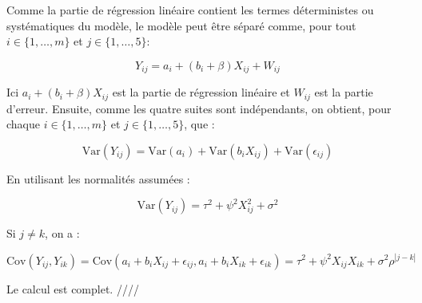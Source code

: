 \documentclass[../main.tex]{subfiles}
\begin{document}
\begin{CJK*}{UTF8}{gbsn}
Comme la partie de régression linéaire contient les termes déterministes ou systématiques du modèle,
le modèle peut être séparé comme, pour tout $i \in \{1, \dots, m\}$ et $j \in \{1, \dots, 5\}$:

\[
Y_{ij} = a_i + (b_i + \beta) X_{ij} + W_{ij}
\]

Ici \(a_i + (b_i + \beta) X_{ij}\) est la partie de régression linéaire et \(W_{ij}\) est la partie d'erreur.
Ensuite, comme les quatre suites sont indépendants, 
on obtient, pour chaque $i \in \{1, \dots, m\}$ et $j \in \{1, \dots, 5\}$, que :

\begin{equation*}
\text{Var}(Y_{ij}) = \text{Var}(a_i) + \text{Var}(b_i X_{ij}) + \text{Var}(\epsilon_{ij})
\end{equation*}

En utilisant les normalités assumées :

\begin{equation*}
\text{Var}(Y_{ij}) = \tau^2 + \psi^2 X_{ij}^2 + \sigma^2
\end{equation*}

Si $j \neq k$, on a :

\begin{equation*}
\text{Cov}(Y_{ij}, Y_{ik}) = \text{Cov}(a_i + b_i X_{ij} + \epsilon_{ij}, a_i + b_i X_{ik} + \epsilon_{ik})
=  \tau^2 + \psi^2 X_{ij} X_{ik} + \sigma^2 \rho^{|j-k|}
\end{equation*}

Le calcul est complet. ////

\end{CJK*}
\end{document}
